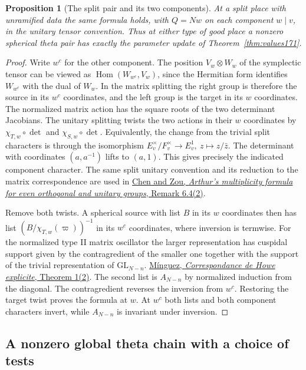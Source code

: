 \documentclass[a4paper,11pt]{article}
\newtheorem{proposition}{Proposition}[section]
\theoremstyle{definition}
\theoremstyle{remark}
\numberwithin{equation}{section}
\begin{document}
\begin{proposition}[The split pair and its two components]
\label{prop:split175}
At a split place with unramified data the same formula holds,
with \(Q=Nw\) on each component \(w\mid v\), in the unitary
tensor convention. Thus at either type of good place a nonzero
spherical theta pair has exactly the parameter update of
Theorem~\ref{thm:values171}.
\end{proposition}
\begin{proof}
Write \(w^c\) for the other component. The position
\(V_w\otimes W_w\) of the symplectic tensor can be viewed
as \(\operatorname{Hom}(W_{w^c},V_w)\), since the Hermitian
form identifies \(W_{w^c}\) with the dual of \(W_w\).
In the matrix splitting the right group is therefore the
source in its \(w^c\) coordinates, and the left group is
the target in its \(w\) coordinates. The normalized
matrix action has the square roots of the two determinant
Jacobians. The unitary splitting twists the two actions
in their \(w\) coordinates by
\(\chi_{T,w}\circ\det\) and \(\chi_{S,w}\circ\det\).
Equivalently, the change from the trivial split characters
is through the isomorphism
\(E_v^\times/F_v^\times\to E_v^1,\ z\mapsto z/\bar z\).
The determinant with coordinates \((a,a^{-1})\) lifts
to \((a,1)\). This gives precisely the indicated
component character. The same split unitary convention and
its reduction to the matrix correspondence are used in
\href{https://ems.press/content/serial-article-files/51452}
{Chen and Zou, \emph{Arthur's multiplicity formula for even
orthogonal and unitary groups}, Remark 6.4(2)}.

Remove both twists. A spherical source with list \(B\) in
its \(w\) coordinates then has list
\((B/\chi_{T,w}(\varpi))^{-1}\) in its \(w^c\) coordinates,
where inversion is termwise. For the normalized type II
matrix oscillator the larger representation has cuspidal
support given by the contragredient of the smaller one
together with the support of the trivial representation of
\(\mathrm{GL}_{N-n}\).
\href{https://arxiv.org/abs/0709.4384}{M\'inguez,
\emph{Correspondance de Howe explicite}, Theorem 1(2)}.
The second list is \(A_{N-n}\) by normalized induction
from the diagonal. The contragredient reverses the inversion
from \(w^c\). Restoring the target twist proves the formula
at \(w\). At \(w^c\) both lists and both component characters
invert, while \(A_{N-n}\) is invariant under inversion.
\end{proof}

\subsection{A nonzero global theta chain with a choice of tests}\label{nav:VIII-06}
\label{sec:global175}
\end{document}
